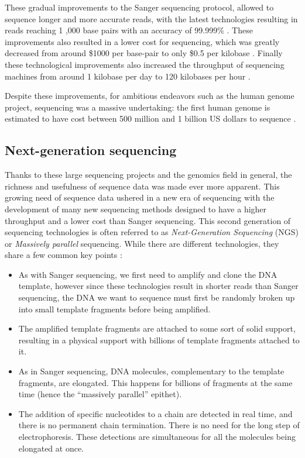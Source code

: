 \documentclass[
  11pt,
  twoside,
  BCOR=10mm,
  listof=totoc]{scrbook}
\begin{document}
These gradual improvements to the Sanger sequencing protocol, allowed to sequence longer and more accurate reads, with the latest technologies resulting in reads reaching 1 ,000 base pairs with an accuracy of 99.999\% \autocite{shendureNextgenerationDNASequencing2008}. These improvements also resulted in a lower cost for sequencing, which was greatly decreased from around \$1000 per base-pair \autocite{collinsHumanGenomeProject2003} to only \$0.5 per kilobase \autocite{shendureNextgenerationDNASequencing2008}. Finally these technological improvements also increased the throughput of sequencing machines from around 1 kilobase per day \autocite{collinsHumanGenomeProject2003} to 120 kilobases per hour \autocite{liuComparisonNextGenerationSequencing2012}.

Despite these improvements, for ambitious endeavors such as the human genome project, sequencing was a massive undertaking: the first human genome is estimated to have cost between 500 million and 1 billion US dollars to sequence \autocite{CostSequencingHuman}.

\hypertarget{next-generation-sequencing}{%
\subsection{Next-generation sequencing}\label{next-generation-sequencing}}

Thanks to these large sequencing projects and the genomics field in general, the richness and usefulness of sequence data was made ever more apparent. This growing need of sequence data ushered in a new era of sequencing with the development of many new sequencing methods designed to have a higher throughput and a lower cost than Sanger sequencing. This second generation of sequencing technologies is often referred to as \emph{Next-Generation Sequencing} (NGS) or \emph{Massively parallel} sequencing. While there are different technologies, they share a few common key points \autocite{metzkerSequencingTechnologiesNext2010}:

\begin{itemize}
\item
  As with Sanger sequencing, we first need to amplify and clone the DNA template, however since these technologies result in shorter reads than Sanger sequencing, the DNA we want to sequence must first be randomly broken up into small template fragments before being amplified.
\item
  The amplified template fragments are attached to some sort of solid support, resulting in a physical support with billions of template fragments attached to it.
\item
  As in Sanger sequencing, DNA molecules, complementary to the template fragments, are elongated. This happens for billions of fragments at the same time (hence the ``massively parallel'' epithet).
\item
  The addition of specific nucleotides to a chain are detected in real time, and there is no permanent chain termination. There is no need for the long step of electrophoresis. These detections are simultaneous for all the molecules being elongated at once.
\end{itemize}
\end{document}

